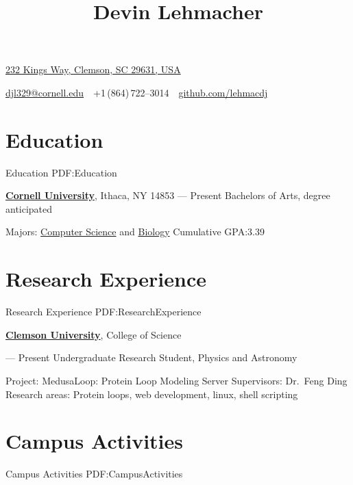 \documentclass[letterpaper,10pt,oneside]{simpleresumecv}
\newcommand{\CVAuthor}{Devin Lehmacher}
\newcommand{\CVWebpage}{github.com/lehmacdj}
\begin{document}

\title{\CVAuthor}

\begin{subtitle}
\href{https://www.google.com/maps/place/232+Kings+Way,+Clemson,+SC+29631,+USA}
{232 Kings Way, Clemson, SC 29631, USA}
\par
\href{mailto:djl329@cornell.edu}
{djl329@cornell.edu}
\,\SubBulletSymbol\,
+1\,(864)\,722--3014
\,\SubBulletSymbol\,
\href{https://\CVWebpage}
{\CVWebpage}
\end{subtitle}

\begin{body}


\section%
{Education}
{Education}
{PDF:Education}

\href{https://www.cornell.edu}
{\textbf{Cornell University}},
Ithaca, NY 14853
\hfill
{} --- Present
\GapNoBreak%
\BulletItem%
Bachelors of Arts, degree anticipated
\begin{detail}
\SubBulletItem%
Majors:
\href{https://www.cs.cornell.edu}
{Computer Science}
and
\href{https://www.biology.cornell.edu}
{Biology}
\SubBulletItem%
Cumulative GPA:\@ 3.39
\end{detail}


\section%
{Research Experience}
{Research Experience}
{PDF:ResearchExperience}

\href{https://www.clemson.edu}
{\textbf{Clemson University}},
College of Science

\GapNoBreak%
\hfill
{} --- Present
\BulletItem%
Undergraduate Research Student, Physics and Astronomy
\begin{detail}
\SubBulletItem%
Project:
MedusaLoop: Protein Loop Modeling Server
\SubBulletItem%
Supervisors:
Dr.\ Feng Ding
\SubBulletItem%
Research areas:
Protein loops, web development, linux, shell scripting
\end{detail}

\section%
{Campus Activities}
{Campus Activities}
{PDF:CampusActivities}


\end{body}
\end{document}
